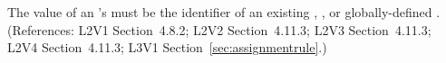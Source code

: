 The value of an \AssignmentRule's  must be the identifier
of an existing \Compartment, \Species, or globally-defined \Parameter.
(References: L2V1 Section~4.8.2; L2V2 Section~4.11.3; L2V3
Section~4.11.3; L2V4 Section~4.11.3; L3V1 Section~\ref{sec:assignmentrule}.)
